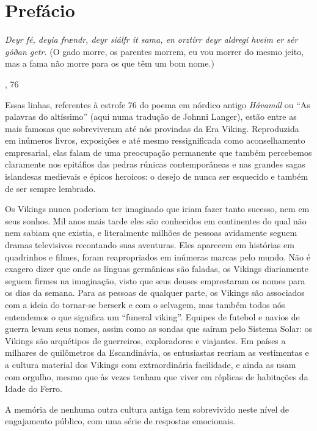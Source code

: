\chapter[Prefácio, \emph{por Neil Price}]{Prefácio}\label{prefuxe1cio}

\epigraph{\emph{%
Deyr fé, deyia frændr, deyr siálfr it sama, en orztírr deyr aldregi
hveim er sér góðan getr.}\linebreak
(O gado morre, os parentes morrem, eu vou morrer do mesmo jeito, mas a
fama não morre para os que têm um bom nome.)}{, 76}

Essas linhas, referentes à estrofe 76 do poema em nórdico antigo
\emph{Hávamál} ou ``As palavras do altíssimo'' (aqui numa tradução de
Johnni Langer), estão entre as mais famosas que sobreviveram até nós
provindas da Era Viking. Reproduzida em inúmeros livros, exposições e
até mesmo ressignificada como aconselhamento empresarial, elas falam de
uma preocupação permanente que também percebemos claramente nos
epitáfios das pedras rúnicas contemporâneas e nas grandes sagas
islandesas medievais e épicos heroicos: o desejo de nunca ser esquecido
e também de ser sempre lembrado.

Os Vikings nunca poderiam ter imaginado que iriam fazer tanto sucesso,
nem em seus sonhos. Mil anos mais tarde eles são conhecidos em
continentes do qual não nem sabiam que existia, e literalmente milhões
de pessoas avidamente seguem dramas televisivos recontando suas
aventuras. Eles aparecem em histórias em quadrinhos e filmes, foram
reapropriados em inúmeras marcas pelo mundo. Não é exagero dizer que
onde as línguas germânicas são faladas, os Vikings diariamente seguem
firmes na imaginação, visto que seus deuses emprestaram os nomes para os
dias da semana. Para as pessoas de qualquer parte, os Vikings são
associados com a ideia do tornar-se berserk e com o selvagem, mas também
todos nós entendemos o que significa um ``funeral viking''. Equipes de
futebol e navios de guerra levam seus nomes, assim como as sondas que
saíram pelo Sistema Solar: os Vikings são arquétipos de guerreiros,
exploradores e viajantes. Em países a milhares de quilômetros da
Escandinávia, os entusiastas recriam as vestimentas e a cultura material
dos Vikings com extraordinária facilidade, e ainda as usam com orgulho,
mesmo que às vezes tenham que viver em réplicas de habitações da Idade
do Ferro.

A memória de nenhuma outra cultura antiga tem sobrevivido neste nível de
engajamento público, com uma série de respostas emocionais.

